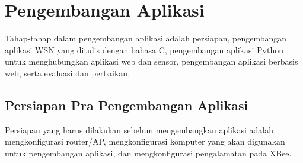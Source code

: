 	\section{Pengembangan Aplikasi}
		Tahap-tahap dalam pengembangan aplikasi adalah persiapan, pengembangan aplikasi WSN yang ditulis dengan bahasa C, pengembangan aplikasi Python untuk menghubungkan aplikasi web dan sensor, pengembangan aplikasi berbasis web, serta evaluasi dan perbaikan.

		\subsection{Persiapan Pra Pengembangan Aplikasi}
			Persiapan yang harus dilakukan sebelum mengembangkan aplikasi adalah mengkonfigurasi router/AP, mengkonfigurasi komputer yang akan digunakan untuk pengembangan aplikasi, dan mengkonfigurasi pengalamatan pada XBee.

